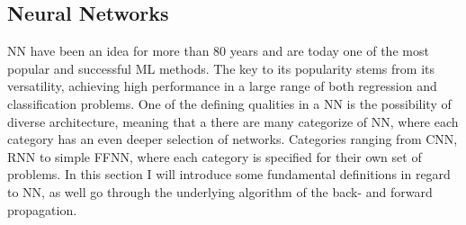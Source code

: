 \subsection{Neural Networks}\label{sec:NN}
\ac{NN} have been an idea for more than 80 years and are today one of the 
most popular and successful \ac{ML} methods. The key to its popularity stems from
its versatility, achieving high performance in a large range of both regression 
and classification problems. One of the defining qualities in a \ac{NN} is the 
possibility of diverse architecture, meaning that a there are many
categorize of \ac{NN}, where each category has an even deeper selection of
networks. Categories ranging from \ac{CNN}, \ac{RNN} to simple \ac{FFNN}, where each
category is specified for their own set of problems. In this section I will introduce 
some fundamental definitions in regard to \ac{NN}, as well go through the underlying 
algorithm of the back- and forward propagation.


